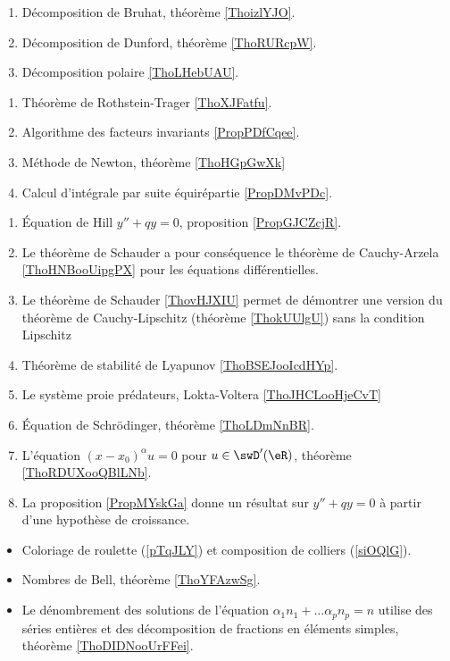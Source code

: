    \label{DECooWTAIooNkZAFg}
\begin{enumerate}
    \item 
        Décomposition de Bruhat, théorème \ref{ThoizlYJO}.
    \item 
        Décomposition de Dunford, théorème \ref{ThoRURcpW}. 
    \item 
        Décomposition polaire \ref{ThoLHebUAU}.
\end{enumerate}

\begin{enumerate}
    \item 
        Théorème de Rothstein-Trager \ref{ThoXJFatfu}.
    \item 
        Algorithme des facteurs invariants \ref{PropPDfCqee}.
    \item 
        Méthode de Newton, théorème \ref{ThoHGpGwXk}
    \item 
        Calcul d'intégrale par suite équirépartie \ref{PropDMvPDc}.
\end{enumerate}

\begin{enumerate}
    \item
        Équation de Hill \( y''+qy=0\), proposition \ref{PropGJCZcjR}.
    \item
            Le théorème de Schauder a pour conséquence le théorème de Cauchy-Arzela \ref{ThoHNBooUipgPX} pour les équations différentielles.
        \item
            Le théorème de Schauder \ref{ThovHJXIU} permet de démontrer une version du théorème de Cauchy-Lipschitz (théorème \ref{ThokUUlgU}) sans la condition Lipschitz
    \item
        Théorème de stabilité de Lyapunov \ref{ThoBSEJooIcdHYp}.
    \item
        Le système proie prédateurs, Lokta-Voltera \ref{ThoJHCLooHjeCvT}
    \item 
        Équation de Schrödinger, théorème \ref{ThoLDmNnBR}.
    \item 
        L'équation \( (x-x_0)^{\alpha}u=0\) pour \( u\in\swD'(\eR)\), théorème \ref{ThoRDUXooQBlLNb}.
    \item 
        La proposition \ref{PropMYskGa} donne un résultat sur \( y''+qy=0\) à partir d'une hypothèse de croissance.
\end{enumerate}

\begin{itemize}
    \item Coloriage de roulette (\ref{pTqJLY}) et composition de colliers (\ref{siOQlG}).
    \item Nombres de Bell, théorème \ref{ThoYFAzwSg}.
    \item Le dénombrement des solutions de l'équation \( \alpha_1 n_1+\ldots \alpha_pn_p=n\) utilise des séries entières et des décomposition de fractions en éléments simples, théorème \ref{ThoDIDNooUrFFei}.
\end{itemize}

